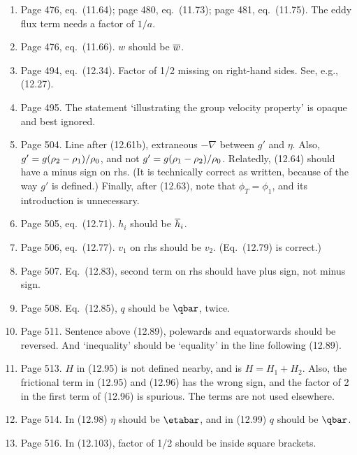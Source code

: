 \documentclass[10pt]{article}
\newcommand{\eq}{eq.\ } \newcommand{\Eq}{Eq.\ }
\begin{document}
\begin{enumerate}
\item Page 476, \eq (11.64); page 480, \eq (11.73);  page 481, \eq(11.75). The eddy flux term needs a factor of $1/a$.

\item Page 476, \eq (11.66). $w$ should be $\overline w$.

 \item Page 494, \eq (12.34). Factor of 1/2 missing on right-hand sides. See, e.g., (12.27).

 \item Page 495. The statement `illustrating the group velocity property' is opaque and best ignored.

\item Page 504. Line after (12.61b), extraneous $-\nabla$ between $g'$ and $\eta$. Also, $g' = g (\rho_2-\rho_1)/\rho_0$, and not $g' = g (\rho_1-\rho_2)/\rho_0$. Relatedly, (12.64) should have a minus sign on rhs. (It is technically correct as written, because of the way $g'$ is defined.) Finally, after (12.63), note that $\phi_T = \phi_1$, and its introduction is unnecessary.

\item Page 505, \eq(12.71). $h_i$ should be $\overline h_i$.

\item Page 506, \eq (12.77). $v_1$ on rhs should be $v_2$. (Eq.\ (12.79) is correct.)

\item Page 507. \Eq (12.83), second term on rhs should have plus sign, not minus sign.

\item Page 508. \Eq (12.85), $q$ should be $\qbar$, twice.

\item Page 511. Sentence above (12.89), polewards and equatorwards should be reversed. And `inequality' should be `equality' in the line following (12.89).

\item Page 513. $H$ in (12.95) is not defined nearby, and is $H = H_1 + H_2$. Also, the frictional term in (12.95) and (12.96) has the wrong sign, and the factor of 2 in the first term of (12.96) is spurious. The terms are not used elsewhere.

\item Page 514. In (12.98) $\eta$ should be $\etabar$, and in (12.99) $q$ should be $\qbar$.

\item Page 516. In (12.103), factor of 1/2 should be inside square brackets.


\end{enumerate}
\end{document}
